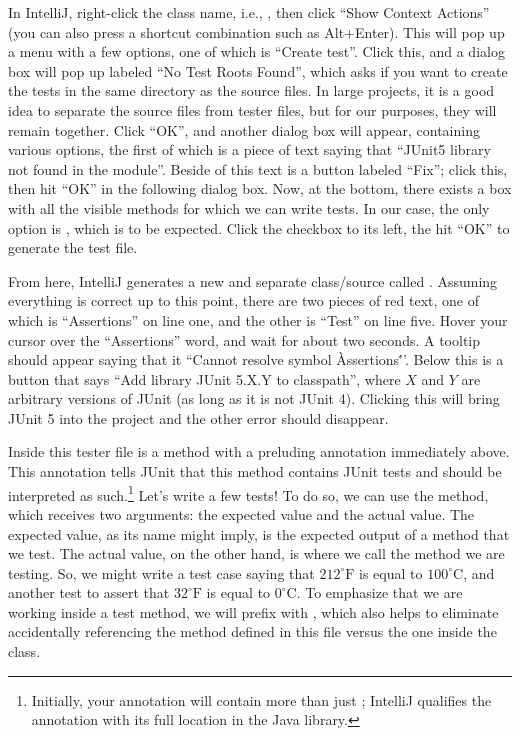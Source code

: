 In IntelliJ, right-click the class name, i.e., , then click ``Show Context Actions'' (you can also press a shortcut combination such as Alt+Enter). This will pop up a menu with a few options, one of which is ``Create test''. Click this, and a dialog box will pop up labeled ``No Test Roots Found'', which asks if you want to create the tests in the same directory as the source files. In large projects, it is a good idea to separate the source files from tester files, but for our purposes, they will remain together. Click ``OK'', and another dialog box will appear, containing various options, the first of which is a piece of text saying that ``JUnit5 library not found in the module''. Beside of this text is a button labeled ``Fix''; click this, then hit ``OK'' in the following dialog box. Now, at the bottom, there exists a box with all the visible methods for which we can write tests. In our case, the only option is , which is to be expected. Click the checkbox to its left, the hit ``OK'' to generate the test file.

From here, IntelliJ generates a new and separate class/source called . Assuming everything is correct up to this point, there are two pieces of red text, one of which is ``Assertions'' on line one, and the other is ``Test'' on line five. Hover your cursor over the ``Assertions'' word, and wait for about two seconds. A tooltip should appear saying that it ``Cannot resolve symbol \`Assertions\'''. Below this is a button that says ``Add library JUnit 5.X.Y to classpath'', where $X$ and $Y$ are arbitrary versions of JUnit (as long as it is not JUnit 4). Clicking this will bring JUnit 5 into the project and the other error should disappear.

Inside this tester file is a method  with a preluding annotation immediately above. This  annotation tells JUnit that this method contains JUnit tests and should be interpreted as such.\footnote{Initially, your annotation will contain more than just ; IntelliJ qualifies the annotation with its full location in the Java library.} Let's write a few tests! To do so, we can use the  method, which receives two arguments: the expected value and the actual value. The expected value, as its name might imply, is the expected output of a method that we test. The actual value, on the other hand, is where we call the method we are testing. So, we might write a test case saying that $212^{\circ}\text{F}$ is equal to $100^{\circ}\text{C}$, and another test to assert that $32^{\circ}\text{F}$ is equal to $0^{\circ}\text{C}$. To emphasize that we are working inside a test method, we will prefix  with , which also helps to eliminate accidentally referencing the  method defined in this file versus the one inside the  class.

